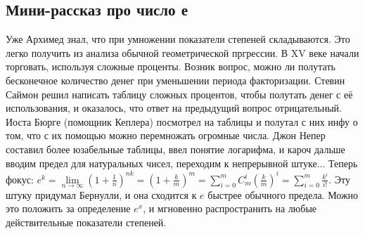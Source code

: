 \subsection{Мини-рассказ про число е}
Уже Архимед знал, что при умножении показатели степеней складываются. 
Это легко получить из анализа обычной геометрической пргрессии. В XV веке
начали торговать, используя сложные проценты. Возник вопрос, можно ли 
полутать бесконечное количество денег при уменьшении периода факторизации. 
Стевин Саймон решил написать таблицу сложных 
процентов, чтобы полутать денег с её использования, и оказалось, что ответ на
предыдущий вопрос отрицательный. Иоста Бюрге (помощник Кеплера) посмотрел
на таблицы и полутал с них инфу о том, что с их помощью можно перемножать 
огромные числа. Джон Непер составил более юзабельные таблицы, ввел понятие
логарифма, и кароч дальше вводим предел для натуральных чисел, переходим к 
непрерывной штуке... Теперь фокус: $e^k=\lim\limits_{n \to \infty}(1+
\frac{1}{n})^{nk}=(1+\frac{k}{m})^m=\sum\limits_{i=0}^{m}C^i_m (\frac{k}{m})
^i=\sum\limits_{i=0}^{m} \frac{k^i}{i!}$. Эту штуку придумал Бернулли, 
и она сходится к $e$ быстрее обычного предела. Можно это положить за 
определение $e^x$, и мгновенно распространить на любые действительные 
показатели степеней.


